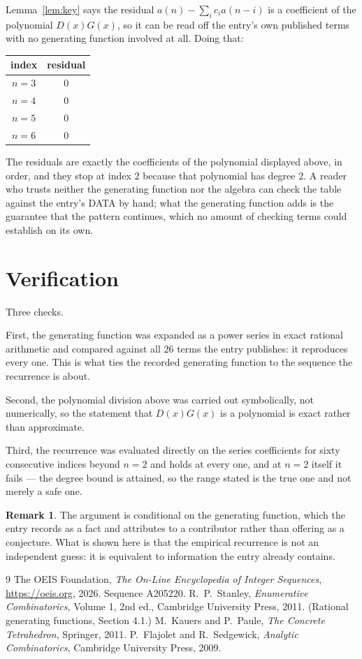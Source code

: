 \documentclass[11pt,a4paper]{article}
\theoremstyle{plain}
\theoremstyle{definition}
\newtheorem{remark}[theorem]{Remark}
\begin{document}
Lemma~\ref{lem:key} says the residual $a(n)-\sum_ic_ia(n-i)$ is a coefficient of the
polynomial $D(x)G(x)$, so it can be read off the entry's own published terms with no
generating function involved at all. Doing that:
\begin{center}
\begin{tabular}{cc}
index & residual \\ \hline
$n=3$ & $0$ \\
$n=4$ & $0$ \\
$n=5$ & $0$ \\
$n=6$ & $0$
\end{tabular}
\end{center}
The residuals are exactly the coefficients of the polynomial displayed above, in order, and
they stop at index $2$ because that polynomial has degree $2$. A reader who trusts
neither the generating function nor the algebra can check the table against the entry's DATA
by hand; what the generating function adds is the guarantee that the pattern continues, which
no amount of checking terms could establish on its own.

\section{Verification}

Three checks.

First, the generating function was expanded as a power series in exact rational arithmetic and
compared against all $26$ terms the entry publishes: it reproduces every one. This is
what ties the recorded generating function to the sequence the recurrence is about.

Second, the polynomial division above was carried out symbolically, not numerically, so the
statement that $D(x)G(x)$ is a polynomial is exact rather than approximate.

Third, the recurrence was evaluated directly on the series coefficients for sixty consecutive
indices beyond $n=2$ and holds at every one, and at $n=2$ itself it fails --- the
degree bound is attained, so the range stated is the true one and not merely a safe one.

\begin{remark}
The argument is conditional on the generating function, which the entry records as a fact and
attributes to a contributor rather than offering as a conjecture. What is shown here is that
the empirical recurrence is not an independent guess: it is equivalent to information the
entry already contains.
\end{remark}

\begin{thebibliography}{9}
 The OEIS Foundation, \emph{The On-Line Encyclopedia of Integer
Sequences}, \url{https://oeis.org}, 2026. Sequence A205220.
 R.~P.~Stanley, \emph{Enumerative Combinatorics}, Volume 1, 2nd ed.,
Cambridge University Press, 2011. (Rational generating functions, Section 4.1.)
 M.~Kauers and P.~Paule, \emph{The Concrete Tetrahedron}, Springer, 2011.
 P.~Flajolet and R.~Sedgewick, \emph{Analytic Combinatorics}, Cambridge
University Press, 2009.
\end{thebibliography}
\end{document}
